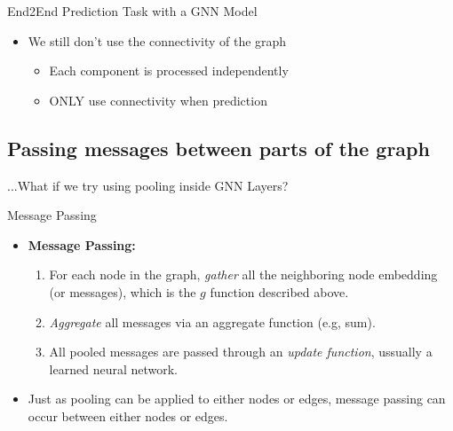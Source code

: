 \documentclass[
    11pt, %
    aspectratio=169, %
]{beamer}
\begin{document}
\begin{frame}{End2End Prediction Task with a GNN Model}
    \begin{itemize}
        \item We still don't use the connectivity of the graph
        \begin{itemize}
            \item Each component is processed independently
            \item ONLY use connectivity when prediction
        \end{itemize}
    \end{itemize}
\end{frame}

\subsection{Passing messages between parts of the graph}
\begin{frame}{}
    \centering
    ...What if we try using pooling inside GNN Layers?
    \vspace{1cm}
    
\end{frame}

\begin{frame}{Message Passing}
    \begin{itemize}
        \item \textbf{Message Passing:}
        \vspace{.5em}
        \begin{enumerate}
            \itemsep.5em
            \item For each node in the graph, \textit{gather} all the neighboring node embedding (or messages), which is the $g$ function described above.
            \item \textit{Aggregate} all messages via an aggregate function (e.g, sum).
            \item All pooled messages are passed through an \textit{update function}, ussually a learned neural network.
        \end{enumerate}

        \item Just as pooling can be applied to either nodes or edges, message passing can occur between either nodes or edges.
    \end{itemize}
\end{frame}
\end{document}
